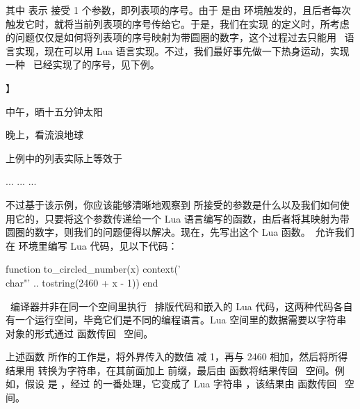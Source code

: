\startTEX
\def\CircledNumber#1{... 定义 ...}
\stopTEX

\noindent 其中  表示  接受 1 个参数，即列表项的序号。由于  是由  环境触发的，且后者每次触发它时，就将当前列表项的序号传给它。于是，我们在实现  的定义时，所考虑的问题仅仅是如何将列表项的序号映射为带圆圈的数字，这个过程过去只能用 \TEX\ 语言实现，现在可以用 Lua 语言实现。不过，我们最好事先做一下热身运动，实现一种 \CONTEXT\ 已经实现了的序号，见下例。

\startexample
\def\FooNumber#1{【#1】}
\defineconversion[Foo][\FooNumber]

\startitemize[Foo][distance=1em, stopper=]
\item 中午，晒十五分钟太阳
\item 晚上，看流浪地球 
\stopitemize
\stopexample
{}

上例中的列表实际上等效于

\startTEX
\startitemize[n, nowhite][left=【, right=】, distance=1em, stopper=]
... ... ...
\stopitemize
\stopTEX

\noindent 不过基于该示例，你应该能够清晰地观察到  所接受的参数是什么以及我们如何使用它的，只要将这个参数传递给一个 Lua 语言编写的函数，由后者将其映射为带圆圈的数字，则我们的问题便得以解决。现在，先写出这个 Lua 函数。\CONTEXT\ 允许我们在  环境里编写 Lua 代码，见以下代码：

\startLUA
\startluacode
function to_circled_number(x)
  context('\\char"' .. tostring(2460 + x - 1))
end
\stopluacode
\stopLUA

\CONTEXT\ 编译器并非在同一个空间里执行 \CONTEXT\ 排版代码和嵌入的 Lua 代码，这两种代码各自有一个运行空间，毕竟它们是不同的编程语言。Lua 空间里的数据需要以字符串对象的形式通过  函数传回 \CONTEXT\ 空间。

上述函数  所作的工作是，将外界传入的数值  减 1，再与 2460 相加，然后将所得结果用  转换为字符串，在其前面加上  前缀，最后由  函数将结果传回 \CONTEXT\ 空间。例如，假设  是 ，经过  的一番处理，它变成了 Lua 字符串 ，该结果由  函数传回 \CONTEXT\ 空间。

